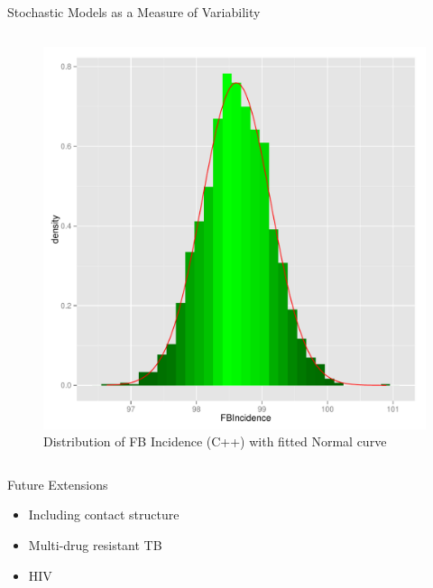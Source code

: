 \documentclass[final]{beamer}
\begin{document}
\begin{frame}
\begin{columns}
\begin{column}{.3\textwidth}
\begin{block}{Stochastic Models as a Measure of Variability}
\begin{block}{}
\begin{column}{.45\textwidth}
\begin{figure}[h]
\begin{center}
                \includegraphics[width=\textwidth]{IN1dist}
              \end{center}
              \caption{Distribution of FB Incidence (C++) with fitted Normal curve}
              \label{fig:IN1dist}
            \end{figure}
          \end{column}
        \end{block}
      \end{block}
      
      \begin{block}{Future Extensions}
        \begin{itemize}
          \item Including contact structure
          \item Multi-drug resistant TB
          \item HIV
        \end{itemize}
      \end{block}
      
    \end{column}
  \end{columns}
\end{frame}
\end{document}
